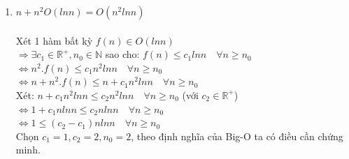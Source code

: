 \documentclass[12pt, letterpaper]{article}
\begin{document}
\begin{enumerate}[label=\bfseries\large\alph*.]
\begin{gather*}
\begin{array}{lll}
				f(n) \geq c_1.g(n) \\
				f(n) \leq c_2.g(n) 
			\end{array}\right. \forall n \geq n_0
			\quad 
			\Leftrightarrow
			\hspace{0.6cm}
			\left\{\begin{array}{lll}
				f(n) = \Omega(g(n)) \\
				f(n) = O(g(n))
			\end{array}\right.
		\end{gather*}
		Vậy ta có điều cần chứng minh: $\Theta(g(n)) = O(g(n)) \cap \Omega(g(n))$.
		\item $n + n^2O(lnn) = O(n^2lnn)$ \\\\
		Xét 1 hàm bất kỳ $f(n) \in O(lnn)$ \\
		$\Rightarrow \exists c_1 \in \mathbb{R^+}, n_0 \in \mathbb{N}$ sao cho:
		$f(n) \leq c_1lnn \quad\forall n\geq n_0$ \\
		$\Leftrightarrow n^2.f(n) \leq c_1n^2lnn \quad\forall n\geq n_0$ \\
		$\Leftrightarrow n + n^2.f(n) \leq n + c_1n^2lnn \quad\forall n\geq n_0$ \\
		Xét: $n + c_1n^2lnn \leq c_2n^2lnn \quad\forall n\geq n_0$ (với $c_2 \in \mathbb{R^+}$) \\
		$\Leftrightarrow 1 + c_1nlnn \leq c_2nlnn \quad\forall n\geq n_0$ \\
		$\Leftrightarrow 1 \leq (c_2 - c_1)nlnn \quad\forall n\geq n_0$ \\
		Chọn $c_1 = 1, c_2 = 2, n_0 =2$, theo định nghĩa của Big-O ta có điều cần chứng minh.
\end{enumerate}
\end{document}
